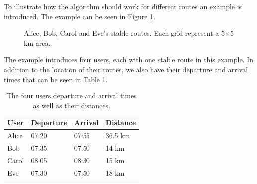 To illustrate how the algorithm should work for different routes an example is introduced. The example can be seen in Figure \ref{fig:algEx1}.
\begin{figure}[!ht]
    \centering
{}
    \caption{Alice, Bob, Carol and Eve's stable routes. Each grid represent a 5$\times$5 km area.}
    \label{fig:algEx1}
\end{figure}
The example introduces four users, each with one stable route in this example. In addition to the location of their routes, we also have their departure and arrival times that can be seen in Table \ref{timetable}.
\begin{table}[]
\centering
\begin{tabular}{@{}llll@{}}
\toprule
\textbf{User} & \textbf{Departure} & \textbf{Arrival} & \textbf{Distance} 	\\ \midrule
Alice         & 07:20                   & 07:55       & 36.5 km 			\\
Bob           & 07:35                   & 07:50       & 14 km  		  		\\
Carol         & 08:05                   & 08:30       & 15 km         		\\
Eve           & 07:30                   & 07:50       & 18 km         		\\ \bottomrule
\end{tabular}
\caption{The four users departure and arrival times as well as their distances.}
\label{timetable}
\end{table}

